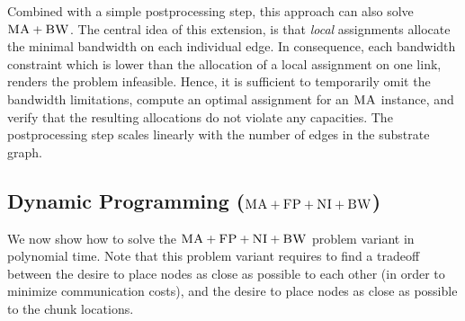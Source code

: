 \documentclass[preprint,12pt]{elsarticle}
\newcommand{\CC}{\textsc{NI}}
\newcommand{\FP}{\textsc{FP}}
\newcommand{\BW}{\textsc{BW}}
\newcommand{\MA}{\textsc{MA}}
\begin{document}
Combined with a simple postprocessing step, this approach can also solve $\MA+\BW$. The central idea of this extension, is
that \emph{local} assignments allocate the minimal bandwidth
on each individual edge. In consequence, each bandwidth constraint
which is lower than the allocation of a local assignment on one link, renders
the problem infeasible. Hence, it is sufficient to temporarily omit the
bandwidth limitations, compute an optimal assignment for an $\MA$ instance, and
verify that the resulting allocations do not violate any capacities. The
postprocessing step scales linearly with the number of edges in the substrate
graph.



\subsection{Dynamic Programming ($\MA+\FP+\CC+\BW$)}\label{ssec:dyn}

We now show how to solve the $\MA+\FP+\CC+\BW$ problem variant
in polynomial time.
Note that this problem variant requires to find a
tradeoff between the desire to place nodes as close as possible to each other
(in order to minimize communication costs), and the desire to place nodes
as close as possible to
the chunk locations.
\end{document}
